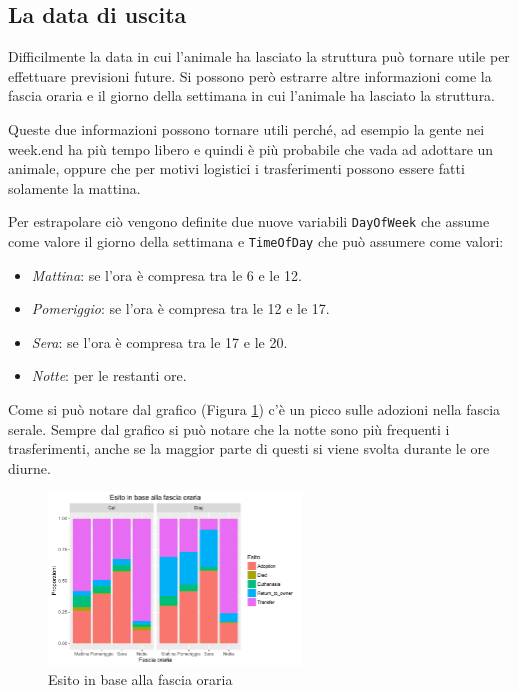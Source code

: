 \subsection{La data di uscita}

Difficilmente la data in cui l'animale ha lasciato la struttura può tornare utile per effettuare previsioni future. Si possono però estrarre altre informazioni come la fascia oraria e il giorno della settimana in cui l'animale ha lasciato la struttura. 

Queste due informazioni possono tornare utili perché, ad esempio la gente nei week.end ha più tempo libero e quindi è più probabile che vada ad adottare un animale, oppure che per motivi logistici i trasferimenti possono essere fatti solamente la mattina.

Per estrapolare ciò vengono definite due nuove variabili \texttt{DayOfWeek} che assume come valore il giorno della settimana e \texttt{TimeOfDay} che può assumere come valori:

\begin{itemize}
	\item \textit{Mattina}: se l'ora è compresa tra le 6 e le 12.
	\item \textit{Pomeriggio}: se l'ora è compresa tra le 12 e le 17.
	\item \textit{Sera}: se l'ora è compresa tra le 17 e le 20.
	\item \textit{Notte}: per le restanti ore.
\end{itemize}

Come si può notare dal grafico (Figura \ref{fig-time}) c'è un picco sulle adozioni nella fascia serale. Sempre dal grafico si può notare che la notte sono più frequenti i trasferimenti, anche se la maggior parte di questi si viene svolta durante le ore diurne.

\begin{figure}[htbp]
	\centering
	\includegraphics[width=0.6\textwidth]{./grafici/esito_time.pdf}
	\caption{Esito in base alla fascia oraria}\label{fig-time}
\end{figure}

